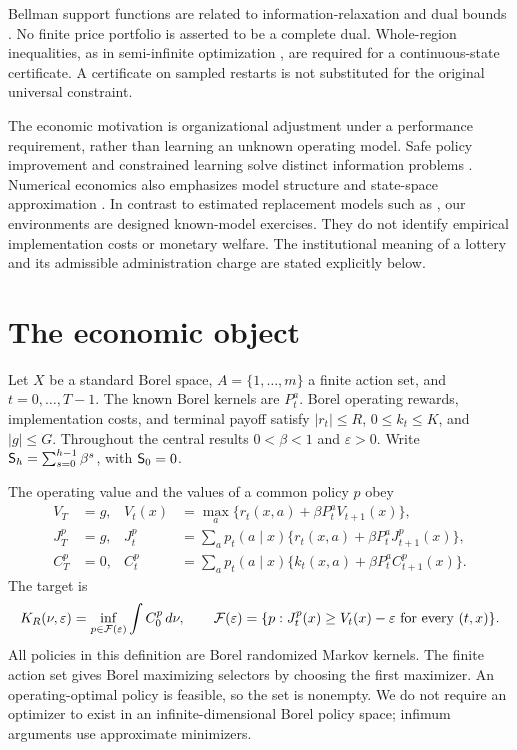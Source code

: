Bellman support functions are related to information-relaxation and dual bounds \citep{BrownSmithSun2010,BrownSmith2014}. No finite price portfolio is asserted to be a complete dual. Whole-region inequalities, as in semi-infinite optimization \citep{HettichKortanek1993}, are required for a continuous-state certificate. A certificate on sampled restarts is not substituted for the original universal constraint.

The economic motivation is organizational adjustment under a performance requirement, rather than learning an unknown operating model. Safe policy improvement and constrained learning solve distinct information problems \citep{Laroche2019,DingEtAl2020,NiKamgarpour2025}. Numerical economics also emphasizes model structure and state-space approximation \citep{Judd1998,BrummScheidegger2017}. In contrast to estimated replacement models such as \citet{Rust1987}, our environments are designed known-model exercises. They do not identify empirical implementation costs or monetary welfare. The institutional meaning of a lottery and its admissible administration charge are stated explicitly below.

\section{The economic object}\label{sec:model45}
Let $X$ be a standard Borel space, $A=\{1,\ldots,m\}$ a finite action set, and $t=0,\ldots,T-1$. The known Borel kernels are $P_t^a$. Borel operating rewards, implementation costs, and terminal payoff satisfy $|r_t|\le R$, $0\le k_t\le K$, and $|g|\le G$. Throughout the central results $0<\beta<1$ and $\varepsilon>0$. Write $\mathsf S_{h}=\sum_{s=0}^{h-1}\beta^s$, with $\mathsf S_{0}=0$.

The operating value and the values of a common policy $p$ obey
\begin{align}
 V_T&=g,& V_t(x)&=\max_a\{r_t(x,a)+\beta P_t^aV_{t+1}(x)\},\label{eq:V45}\\
 J_T^p&=g,& J_t^p&=\sum_a p_t(a\mid x)\{r_t(x,a)+\beta P_t^aJ_{t+1}^p(x)\},\label{eq:J45}\\
 C_T^p&=0,& C_t^p&=\sum_a p_t(a\mid x)\{k_t(x,a)+\beta P_t^aC_{t+1}^p(x)\}.\label{eq:C45}
\end{align}
The target is
\begin{equation}\label{eq:target45}
 K_R(\nu,\varepsilon)=\inf_{p\in\mathcal F(\varepsilon)}\int C_0^p\,d\nu,
 \qquad \mathcal F(\varepsilon)=\{p:J_t^p(x)\ge V_t(x)-\varepsilon\ \hbox{for every }(t,x)\}.
\end{equation}
All policies in this definition are Borel randomized Markov kernels. The finite action set gives Borel maximizing selectors by choosing the first maximizer. An operating-optimal policy is feasible, so the set is nonempty. We do not require an optimizer to exist in an infinite-dimensional Borel policy space; infimum arguments use approximate minimizers.

